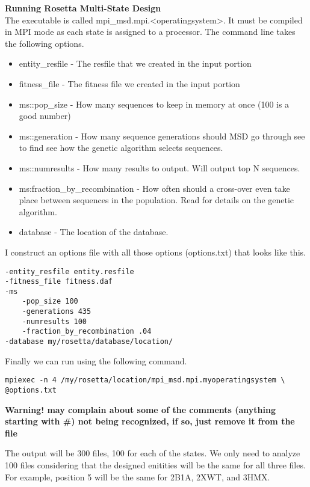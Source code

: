 \textbf{Running Rosetta Multi-State Design} \\
The \rosetta executable is called mpi\_msd.mpi.<operatingsystem>. It must be compiled in MPI mode as each state is assigned to a processor. The command line takes the following options.

\begin{itemize}
\item entity\_resfile - The resfile that we created in the input portion
\item fitness\_file - The fitness file we created in the input portion
\item ms::pop\_size - How many sequences to keep in memory at once (100 is a good number)
\item ms::generation - How many sequence generations should MSD go through see \citep{LeaverFay:2011ji} to find see how the genetic algorithm selects sequences.
\item ms::numresults - How many results to output. Will output top N sequences.
\item ms:fraction\_by\_recombination - How often should a cross-over even take place between sequences in the population. Read \citep{LeaverFay:2011ji} for details on the genetic algorithm.
\item database - The location of the database.
\end{itemize}

I construct an options file with all those options (options.txt) that looks like this.

\begin{lstlisting}
-entity_resfile entity.resfile
-fitness_file fitness.daf
-ms
    -pop_size 100
    -generations 435
    -numresults 100
    -fraction_by_recombination .04
-database my/rosetta/database/location/
\end{lstlisting}

Finally we can run \rosetta using the following command.

\begin{lstlisting}
mpiexec -n 4 /my/rosetta/location/mpi_msd.mpi.myoperatingsystem \
@options.txt
\end{lstlisting}
\textbf{Warning! \linebreak \rosetta may complain about some of the comments (anything starting with \#) not being recognized, if so, just remove it from the file}

The output will be 300 files, 100 for each of the states. We only need to analyze 100 files considering that the designed enitities will be the same for all three files. For example, position 5 will be the same for 2B1A, 2XWT, and 3HMX.

